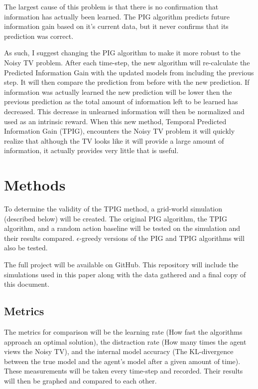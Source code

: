 \documentclass[12pt]{thesis}
\begin{document}
The largest cause of this problem is that there is no confirmation that information has actually been learned. The PIG algorithm predicts future information gain based on it’s current data, but it never confirms that its prediction was correct.

As such, I suggest changing the PIG algorithm to make it more robust to the Noisy TV problem. After each time-step, the new algorithm will re-calculate the Predicted Information Gain with the updated models from including the previous step. It will then compare the prediction from before with the new prediction. If information was actually learned the new prediction will be lower then the previous prediction as the total amount of information left to be learned has decreased. This decrease in unlearned information will then be normalized and used as an intrinsic reward. When this new method, Temporal Predicted Information Gain (TPIG), encounters the Noisy TV problem it will quickly realize that although the TV looks like it will provide a large amount of information, it actually provides very little that is useful.

\section{Methods}
To determine the validity of the TPIG method, a grid-world simulation (described below) will be created. The original PIG algorithm, the TPIG algorithm, and a random action baseline will be tested on the simulation and their results compared. $\epsilon$-greedy versions of the PIG and TPIG algorithms will also be tested.

The full project will be available on GitHub.\cite{TPIG:github} This repository will include the simulations used in this paper along with the data gathered and a final copy of this document.

\subsection{Metrics}
The metrics for comparison will be the learning rate (How fast the algorithms approach an optimal solution), the distraction rate (How many times the agent views the Noisy TV), and the internal model accuracy (The KL-divergence between the true model and the agent's model after a given amount of time). These measurements will be taken every time-step and recorded. Their results will then be graphed and compared to each other.
\end{document}
